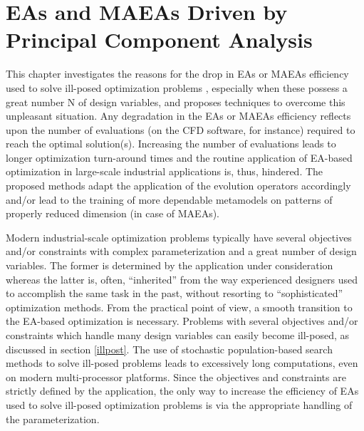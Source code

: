 \ifpdf
    \graphicspath{{4/figures/PNG/}{4/figures/PDF/}{3/figures/}}
\else
    \graphicspath{{4/figures/EPS/}{4/figures/}}
\fi

\chapter{EAs and MAEAs Driven by Principal Component Analysis} %
\label{VarCorrChapter}

This chapter investigates the reasons for the drop in EAs or MAEAs efficiency used to solve ill-posed optimization problems \cite{Salomon,Roy_2002a,Ghisu_2010}, especially when these possess a great number N of design variables, and proposes techniques to overcome this unpleasant situation. Any degradation in the EAs or MAEAs efficiency reflects upon the number of evaluations (on the CFD software, for instance) required to reach the optimal solution(s).  Increasing the number of evaluations leads to longer optimization turn-around times and the routine application of EA-based optimization in large-scale industrial applications is, thus, hindered. The proposed methods adapt the application of the evolution operators accordingly and/or lead to the training of more dependable metamodels on patterns of properly reduced dimension (in case of MAEAs).

Modern industrial-scale optimization problems typically have several objectives and/or constraints with complex parameterization and a great number of design variables. The former is determined by the application under consideration whereas the latter is, often, ``inherited'' from the way experienced designers used to accomplish the same task in the past, without resorting to ``sophisticated'' optimization methods. From the practical point of view, a smooth transition to the EA-based optimization is necessary. Problems with several objectives and/or constraints which handle many design variables can easily become ill-posed, as discussed in section \ref{illpost}. The use of stochastic population-based search methods to solve ill-posed problems leads to excessively long computations, even on modern multi-processor platforms. Since the objectives and constraints are strictly defined by the application, the only way to increase the efficiency of EAs used to solve ill-posed optimization problems is via the appropriate handling of the parameterization. 


